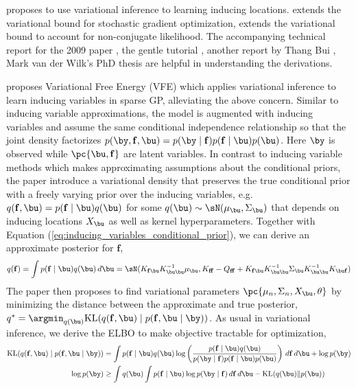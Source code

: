 \documentclass[11pt]{article}
\renewcommand\bf{\ensuremath{\mathbf{f}}}
\begin{document}
\cite{titsiasVariationalLearningInducing2009} proposes to use variational inference to learning inducing locations. \cite{hensmanGaussianProcessesBig2013} extends the variational bound for stochastic gradient optimization, \cite{hensmanScalableVariationalGaussian2014} extends the variational bound to account for non-conjugate likelihood. The accompanying technical report for the 2009 paper \cite{titsiasVariationalModelSelection2009}, the gentle tutorial \cite{galVariationalInferenceSparse2014}, another report by Thang Bui \cite{buiSparseApproximationsNonConjugate2014}, Mark van der Wilk's PhD thesis \cite{SparseGaussianProcess2018} are helpful in understanding the derivations.

\cite{titsiasVariationalLearningInducing2009} proposes Variational Free Energy (VFE) which applies variational inference to learn inducing variables in sparse GP, alleviating the above concern. Similar to inducing variable approximations, the model is augmented with inducing variables and assume the same conditional independence relationship so that the joint density factorizes $p(\by,\bf,\bu) = p(\by\mid\bf) p(\bf\mid \bu) p(\bu)$. Here $\by$ is observed while $\pc{\bu,\bf}$ are latent variables. In contrast to inducing variable methods which makes approximating assumptions about the conditional priors, the paper introduce a variational density that preserves the true conditional prior with a freely varying prior over the inducing variables, e.g. $q(\bf,\bu) = p(\bf\mid\bu)q(\bu)$ for some $q(\bu)\sim \sN(\mu_{\bu},\Sigma_{\bu})$ that depends on inducing locations $X_{\bu}$ as well as kernel hyperparameters. Together with Equation (\ref{eq:inducing_variables_conditional_prior}), we can derive an approximate posterior for $\bf$,
\begin{align}
    q(\bf)
        = \int p(\bf\mid\bu)q(\bu) \, d\bu
        = \sN( K_{\bf\bu} K_{\bu\bu}^{-1} \mu_{\bu},
               K_{\bf\bf} - Q_{\bf\bf} +  K_{\bf\bu} K_{\bu\bu}^{-1} \Sigma_{\bu} K_{\bu\bu}^{-1} K_{\bu\bf} )
    \label{eq:inducing_variables_approximate_prior_f}
\end{align}
The paper then proposes to find variational parameters $\pc{\mu_n,\Sigma_n,X_{\bu},\theta}$ by minimizing the distance between the approximate and true posterior, $q^* = \argmin_{q(\bu)} \text{KL}(q(\bf,\bu)\mid p(\bf,\bu\mid \by))$. As usual in variational inference, we derive the ELBO to make objective tractable for optimization,
\begin{align}
    \text{KL}(q(\bf,\bu)\mid p(\bf,\bu\mid \by))
        &= \int p(\bf\mid\bu) q(\bu) \log \left( \frac{p(\bf\mid\bu)q(\bu)}{p(\by\mid\bf) p(\bf\mid\bu) p(\bu)}  \right) \, d\bf\, d\bu + \log p(\by) \\
    \log p(\by)
        &\geq \int q(\bu) \int p(\bf\mid\bu) \log p(\by\mid \bf) \, d\bf \, d\bu - \text{KL}(q(\bu) \Vert p(\bu))
    \label{eq:sparse_gp_vfe_elbo}
\end{align}
\end{document}
